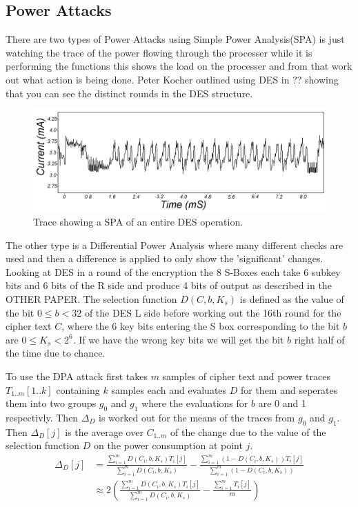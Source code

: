 \documentclass[a4paper,12pt]{article}
\begin{document}
\subsection{Power Attacks}
There are two types of Power Attacks using Simple Power Analysis(SPA) is just watching the trace of the power flowing through the processer while it is performing the functions this shows the load on the processer and from that work out what action is being done. Peter Kocher outlined using DES in ?? showing that you can see the distinct rounds in the DES structure. 

\begin{figure}
    \includegraphics[width=\textwidth]{SPAtrace.png}
    \caption{Trace showing a SPA of an entire DES operation.}
    \label{fig:desRound}
\end{figure}
The other type is a Differential Power Analysis where many different checks are used and then a difference is applied to only show the 'significant' changes. Looking at DES in a round of the encryption the 8 S-Boxes each take 6 subkey bits and 6 bits of the R side and produce 4 bits of output as described in the {\color{red} OTHER PAPER}. The selection function $D(C,b,K_s)$ is defined as the value of the bit $0 \le b < 32$ of the DES L side before working out the 16th round for the cipher text $C$, where the 6 key bits entering the S box corresponding to the bit $b$ are $0 \le K_s < 2^6$. If we have the wrong key bits we will get the bit $b$ right half of the time due to chance. 

To use the DPA attack first takes $m$ samples of cipher text and power traces $T_{1..m}[1..k]$ containing $k$ samples each and evaluates $D$ for them and seperates them into two groups $g_0$ and $g_1$ where the evaluations for $b$ are 0 and 1 respectivly. Then $\Delta_D$ is worked out for the means of the traces from $g_0$ and $g_1$. Then $\Delta_D[j]$ is the average over $C_{1..m}$ of the change due to the value of the selection function $D$ on the power consumption at point $j$. 
\begin{align}
    \Delta_D[j] &= \frac{\sum_{i=1}^mD(C_i,b,K_s)T_i[j]}{\sum_{i=1}^mD(C_i,b,K_s)} -  \frac{\sum_{i=1}^m(1-D(C_i,b,K_s))T_i[j]}{\sum_{i=1}^m(1-D(C_i,b,K_s))}\\
    &\approx 2( \frac{\sum_{i=1}^mD(C_i,b,K_s)T_i[j]}{\sum_{i=1}^mD(C_i,b,K_s)} - \frac{\sum_{i=1}^mT_i[j]}{m}) 
\end{align}
\end{document}

